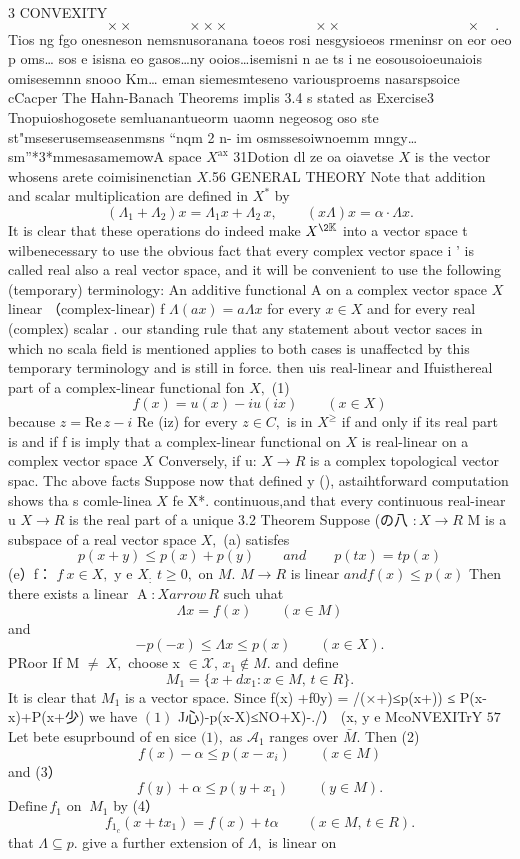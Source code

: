 3 CONVEXITY $$ \qquad\qquad\qquad\times\times\qquad\qquad\times\times\times\qquad\qquad\qquad\times\times\quad\qquad\qquad\qquad\qquad\times\quad. $$ Tios ng fgo onesneson nemsnusoranana toeos rosi nesgysioeos rmeninsr on eor oeo p oms… sos e isisna eo gasos…ny ooios…isemisni n ae ts i ne eosousoioeunaiois omisesemnn snooo Km… eman siemesmteseno variousproems nasarspsoice cCacper The Hahn-Banach Theorems implis 3.4 s stated as Exercise3 Tnopuioshogosete semluanantueorm uaomn negeosog oso ste st"mseserusemseasenmsns “nqm 2 n- im osmssesoiwnoemm mngy…sm”*3*mmesasamemowA space $X^{\mathrm{ax}}$ 31Dotion dl ze oa oiavetse $\textstyle X$ is the vector whosens arete coimisinenctian $X.$56 GENERAL THEORY Note that addition and scalar multiplication are defined in $X^{\ast}$ by $$ (\Lambda_{1}+\Lambda_{2})x=\Lambda_{1}x+\Lambda_{2}\,x,\qquad(x\Lambda)x=\alpha\cdot\Lambda x. $$ It is clear that these operations do indeed make $X^{\2\mathbb{K}}$ into a vector space t wilbenecessary to use the obvious fact that every complex vector space i ’ is called real also a real vector space, and it will be convenient to use the following (temporary) terminology: An additive functional A on a complex vector space $\textstyle X$ linear （complex-linear) f $\Lambda(a x)=a\Lambda x$ for every $x\in X$ and for every real (complex) scalar . our standing rule that any statement about vector saces in which no scala field is mentioned applies to both cases is unaffectcd by this temporary terminology and is still in force. then uis real-linear and Ifuisthereal part of a complex-linear functional fon $X,$ (1) $$ f(x)=u(x)-i u(i x)\qquad(x\in X) $$ because $z=\mathrm{Re}\,z-i$ Re (iz) for every $z\in C,$ is in $\textstyle X^{\geq}$ if and only if its real part is and if f is imply that a complex-linear functional on $\textstyle X$ is real-linear on a complex vector space $X$ Conversely, if u: $X\to R$ is a complex topological vector spac. Thc above facts Suppose now that defined y (), astaihtforward computation shows tha s comle-linea $\textstyle X$ fe X*. continuous,and that every continuous real-inear u $X\to R$ is the real part of a unique 3.2 Theorem Suppose (の八 $:X\to R$ M is a subspace of a real vector space $X,$ (a) satisfes $$ p(x+y)\leq p(x)+p(y)\qquad a n d\qquad p(t x)=t p(x) $$ (e）f： $f\ x\in X,$ y e $X_{\mathrm{\mathrm{\mathrm{:}}}}$ $t\geq0,$ on $M.$ $M\to R$ is linear $a n d f(x)\leq p(x)$ Then there exists a linear $\operatorname{A}\!:X{ arrow}\,R$ such uhat $$ \Lambda x=f(x)\qquad(x\in M) $$ and $$ -p(-x)\leq\Lambda x\leq p(x)\qquad(x\in X). $$ PRoor If M ${\boldsymbol{\neq}}\ X,$ choose x $\in{\mathcal{X}},\,x_{1}\not\in M.$ and define $$ M_{1}=\{x+d x_{1}:x\in M,\,t\in R\}. $$ It is clear that $M_{1}$ is a vector space. Since f(x) +f0y) = /(×+)≤p(x+)) ≤ P(x-x)+P(x+少) we have $(1)$ J心)-p(x-X)≤NO+X)-./） (x, y e McoNVEXITrY $57$ Let bete esuprbound of en sice ${\boldsymbol{(}}1),$ as ${\mathcal{A}}_{1}$ ranges over $\bar{M}.$ Then (2) $$ f(x)-\alpha\leq p(x-x_{i})\qquad(x\in M) $$ and (3） $$ f(y)+\alpha\leq p(y+x_{1})\qquad(y\in M). $$ $\mathrm{Define}\,f_{1}$ on $\ M_{1}$ by (4） $$ f_{1_{c}}(x+t x_{1})=f(x)+t\alpha\qquad(x\in M,\,t\in R). $$ that $\Lambda\subseteq p.$ give a further extension of $\Lambda,$ is linear on 